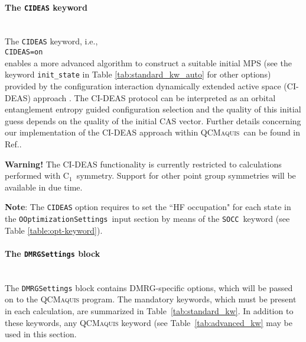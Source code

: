 \documentclass[bibliography=totoc,12pt,a4paper]{scrartcl}
\newcommand{\qcm}{\textsc{QCMaquis}}
\newcommand{\kwd}[1]{\texttt{#1}}
\begin{document}
\paragraph{The \kwd{CIDEAS} keyword}\mbox{}\\
The \kwd{CIDEAS} keyword, i.e.,\\
\noindent\kwd{CIDEAS=on}\\
enables a more advanced algorithm to construct a suitable initial MPS (see the keyword \kwd{init\_state} in Table \ref{tab:standard_kw_auto} for other options) provided by the configuration interaction dynamically extended active space (CI-DEAS) approach \cite{Legeza2003,fiedler}. The CI-DEAS protocol can be interpreted as an orbital entanglement entropy guided configuration selection and the quality of this initial guess depends on the quality of the initial CAS vector.
Further details concerning our implementation of the CI-DEAS approach within \qcm\ can be found in Ref.\cite{interface}.
\begin{framed}
\noindent \textbf{Warning!} The CI-DEAS functionality is currently restricted to calculations performed with C$_1$\ symmetry. Support for other point group symmetries will be available in due time.

\noindent \textbf{Note}: The \kwd{CIDEAS} option requires to set the ``HF occupation" for each state in the \texttt{OOptimizationSettings}\ input section by means of the \kwd{SOCC}\ keyword (see Table \ref{table:opt-keyword}).
\end{framed}

\paragraph{The \kwd{DMRGSettings} block}\mbox{}\\
The \kwd{DMRGSettings} block contains DMRG-specific options, which will be passed on to the \qcm{} program. The mandatory keywords, which must be present in each calculation, are summarized in Table~\ref{tab:standard_kw}. In addition to these keywords, any \qcm{} keyword (see Table~\ref{tab:advanced_kw} may be used in this section.
\end{document}
